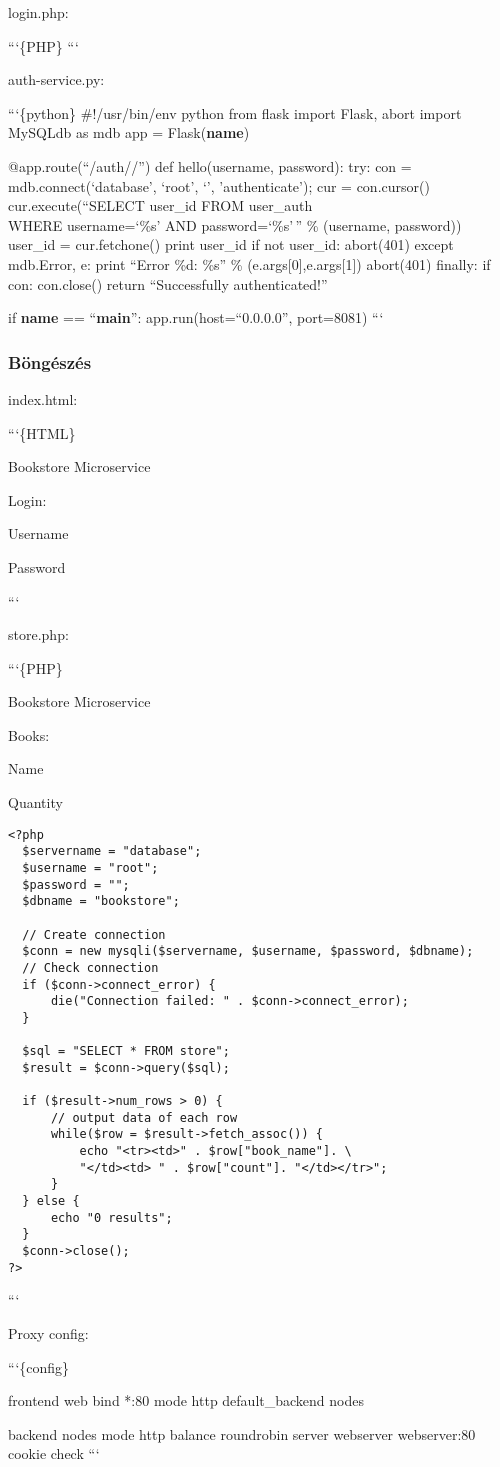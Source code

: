 login.php:

```\{PHP\} ```

auth-service.py:

```\{python\} \#!/usr/bin/env python from flask import Flask, abort
import MySQLdb as mdb app = Flask(\textbf{name})

@app.route(``/auth//'') def hello(username, password): try: con =
mdb.connect(`database', `root', `', 'authenticate'); cur = con.cursor()
cur.execute(``SELECT user\_id FROM user\_auth\\ WHERE username=`\%s' AND
password=`\%s'\,'' \% (username, password)) user\_id = cur.fetchone()
print user\_id if not user\_id: abort(401) except mdb.Error, e: print
``Error \%d: \%s'' \% (e.args{[}0{]},e.args{[}1{]}) abort(401) finally:
if con: con.close() return ``Successfully authenticated!''

if \textbf{name} == ``\textbf{main}'': app.run(host=``0.0.0.0'',
port=8081) ```

\subsubsection{Böngészés}\label{buxf6nguxe9szuxe9s}

index.html:

```\{HTML\}

Bookstore Microservice

Login:

Username

Password

```

store.php:

```\{PHP\}

Bookstore Microservice

Books:

Name

Quantity

\begin{verbatim}
<?php
  $servername = "database";
  $username = "root";
  $password = "";
  $dbname = "bookstore";

  // Create connection
  $conn = new mysqli($servername, $username, $password, $dbname);
  // Check connection
  if ($conn->connect_error) {
      die("Connection failed: " . $conn->connect_error);
  }

  $sql = "SELECT * FROM store";
  $result = $conn->query($sql);

  if ($result->num_rows > 0) {
      // output data of each row
      while($row = $result->fetch_assoc()) {
          echo "<tr><td>" . $row["book_name"]. \
          "</td><td> " . $row["count"]. "</td></tr>";
      }
  } else {
      echo "0 results";
  }
  $conn->close();
?>
\end{verbatim}

```

Proxy config:

```\{config\}

frontend web bind *:80 mode http default\_backend nodes

backend nodes mode http balance roundrobin server webserver webserver:80
cookie check ```
